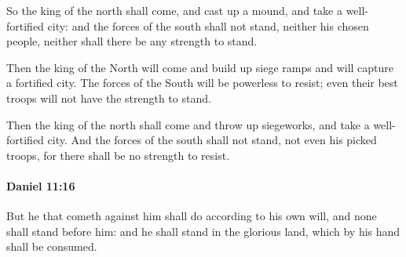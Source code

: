 			\begin{versebox}
					\item[BHS] 
					\item[LXX] 
					\item[ASV] So the king of the north shall come, and cast up a mound, and take a well-fortified city: and the forces of the south shall not stand, neither his chosen people, neither shall there be any strength to stand.
					\item[NIV] Then the king of the North will come and build up siege ramps and will capture a fortified city. The forces of the South will be powerless to resist; even their best troops will not have the strength to stand.
					\item[NRSV] Then the king of the north shall come and throw up siegeworks, and take a well-fortified city. And the forces of the south shall not stand, not even his picked troops, for there shall be no strength to resist.
			\end{versebox}

		\paragraph{Daniel 11:16} %
			\label{DANIEL-11-16}

			But he that cometh against him shall do according to his own will, and none shall stand before him: and he shall stand in the glorious land, which by his hand shall be consumed.

